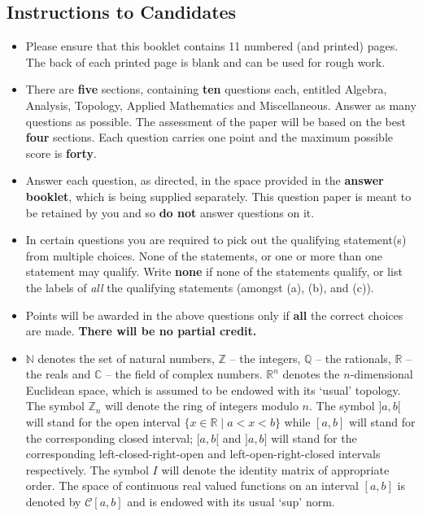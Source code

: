 \documentclass[11pt,a4paper]{article}
\newcommand{\N}{\mathbb{N}}
\newcommand{\Z}{\mathbb{Z}}
\newcommand{\Q}{\mathbb{Q}}
\newcommand{\R}{\mathbb{R}}
\newcommand{\C}{\mathbb{C}}
\begin{document}
\subsection*{Instructions to Candidates}
\begin{itemize}
  \item Please ensure that this booklet contains 11 numbered (and printed) pages. The back of each printed page is blank and can be used for rough work.
  \item There are \textbf{five} sections, containing \textbf{ten} questions each, entitled Algebra, Analysis, Topology, Applied Mathematics and Miscellaneous. Answer as many questions as possible. The assessment of the paper will be based on the best \textbf{four} sections. Each question carries one point and the maximum possible score is \textbf{forty}.
  \item Answer each question, as directed, in the space provided in the \textbf{answer booklet}, which is being supplied separately. This question paper is meant to be retained by you and so \textbf{do not} answer questions on it.
  \item In certain questions you are required to pick out the qualifying statement(s) from multiple choices. None of the statements, or one or more than one statement may qualify. Write \textbf{none} if none of the statements qualify, or list the labels of \emph{all} the qualifying statements (amongst (a), (b), and (c)).
  \item Points will be awarded in the above questions only if \textbf{all} the correct choices are made. \textbf{There will be no partial credit.}
  \item $\N$ denotes the set of natural numbers, $\Z$ -- the integers, $\Q$ -- the rationals, $\R$ -- the reals and $\C$ -- the field of complex numbers. $\R^n$ denotes the $n$-dimensional Euclidean space, which is assumed to be endowed with its `usual' topology. The symbol $\Z_n$ will denote the ring of integers modulo $n$. The symbol $]a, b[$ will stand for the open interval $\{x \in \R \mid a < x < b\}$ while $[a, b]$ will stand for the corresponding closed interval; $[a, b[$ and $]a, b]$ will stand for the corresponding left-closed-right-open and left-open-right-closed intervals respectively. The symbol $I$ will denote the identity matrix of appropriate order. The space of continuous real valued functions on an interval $[a, b]$ is denoted by $\mathcal{C}[a, b]$ and is endowed with its usual `sup' norm.
\end{itemize}
\end{document}
